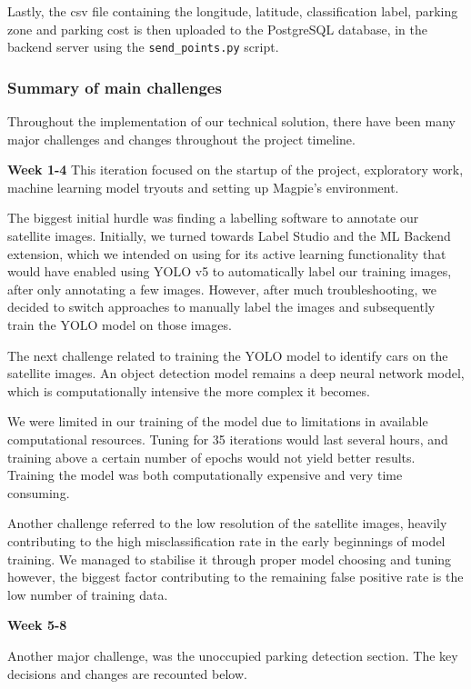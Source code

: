 Lastly, the csv file containing the longitude, latitude, classification label, parking
zone and parking cost is then uploaded to the PostgreSQL database, in the
backend server using the \texttt{send\_points.py} script.

\newpage{}

\subsubsection{Summary of main challenges}
Throughout the implementation of our technical solution, there have been many
major challenges and changes throughout the project timeline.

\textbf{Week 1-4}
This iteration focused on the startup of the project, exploratory work, machine
learning model tryouts and setting up Magpie's environment.

The biggest initial
hurdle was finding a labelling software to annotate our satellite images.
Initially, we turned towards Label Studio and the ML Backend extension, 
which we intended on using
for its active learning functionality that would have enabled using YOLO v5 to
automatically label our training images, after only annotating a few images.
However, after much troubleshooting, we decided to switch approaches to
manually label the images and subsequently train the YOLO model on those images.

The next challenge related to training the YOLO model to identify cars on the
satellite images. An object detection model remains a deep neural network model,
which is computationally intensive the more complex it becomes.

We were limited in our training of the model due to limitations in available
computational resources. Tuning for 35 iterations would last several hours, and
training above a certain number of epochs would not yield better results.
Training the model was both computationally expensive and very time consuming.

Another challenge referred to the low resolution of the satellite images,
heavily contributing to the high misclassification rate in the early beginnings of
model training. We managed to stabilise it through proper model choosing and
tuning however, the biggest factor contributing to the remaining false positive
rate is the low number of training data.

\textbf{Week 5-8}

Another major challenge, was the unoccupied parking detection section. The key
decisions and changes are recounted below.


